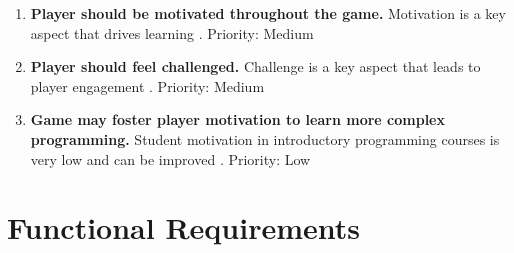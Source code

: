 \documentclass[a4paper,11.5pt]{report}
\numberwithin{figure}{section}
\numberwithin{table}{section}
\numberwithin{equation}{section}
\numberwithin{equation}{section}
\begin{document}
\begin{enumerate}[label=3.1.\arabic*]
  \item \textbf{Player should be motivated throughout the game.} Motivation is a key aspect that drives learning \citep{Gee2003}. \newline Priority: Medium
  
  \item \textbf{Player should feel challenged.} Challenge is a key aspect that leads to player engagement \citep{whitton2011}. \newline Priority: Medium
  
  \item \textbf{Game may foster player motivation to learn more complex programming.} Student motivation in introductory programming courses is very low and can be improved \citep{Koulouri2014}. \newline Priority: Low
  
\end{enumerate}


\section{Functional Requirements}
\end{document}
